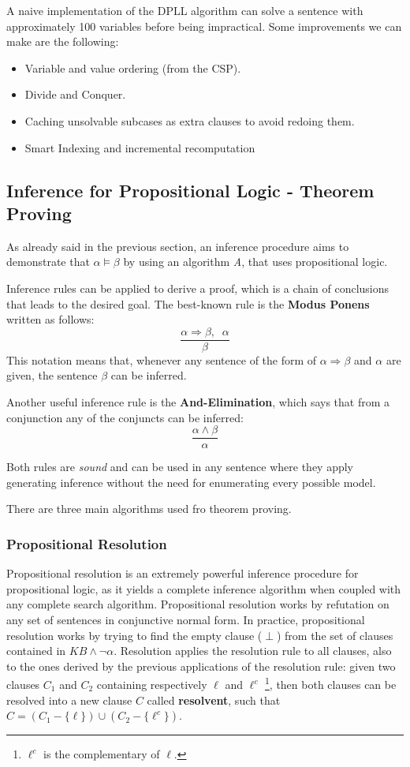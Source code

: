 \documentclass{article}
\begin{document}
A naive implementation of the DPLL algorithm can solve a sentence with approximately 100 variables before being impractical. Some improvements we can make are the following:
\begin{itemize}
    \item Variable and value ordering (from the CSP).
    \item Divide and Conquer.
    \item Caching unsolvable subcases as extra clauses to avoid redoing them.
    \item Smart Indexing and incremental recomputation 
\end{itemize}

\subsection{Inference for Propositional Logic - Theorem Proving}
As already said in the previous section, an inference procedure aims to demonstrate that \(\alpha \models \beta\) by using an algorithm \textit{A}, that uses propositional logic. 

Inference rules can be applied to derive a proof, which is a chain of conclusions that leads to the desired goal. The best-known rule is the \textbf{Modus Ponens} written as follows:
\[\frac{\alpha \Rightarrow \beta, \;\; \alpha}{\beta}\]
This notation means that, whenever any sentence of the form of \(\alpha \Rightarrow \beta\) and \(\alpha\) are given, the sentence \(\beta\) can be inferred.

Another useful inference rule is the \textbf{And-Elimination}, which says that from a conjunction any of the conjuncts can be inferred:
\[\frac{\alpha \land \beta}{\alpha}\]

Both rules are \textit{sound} and can be used in any sentence where they apply generating inference without the need for enumerating every possible model. 

There are three main algorithms used fro theorem proving.

\subsubsection{Propositional Resolution}
Propositional resolution is an extremely powerful inference procedure for propositional logic, as it yields a complete inference algorithm when coupled with any complete search algorithm. Propositional resolution works by refutation on any set of sentences in conjunctive normal form. In practice, propositional resolution works by trying to find the empty clause (\(\perp\)) from the set of clauses contained in \(KB \land \neg \alpha\). Resolution applies the resolution rule to all clauses, also to the ones derived by the previous applications of the resolution rule: given two clauses \(C_1\) and \(C_2\) containing respectively \(\ell\) and \(\ell^c\) \footnote{\(\ell^c\) is the complementary of \(\ell\).}, then both clauses can be resolved into a new clause \(C\) called \textbf{resolvent}, such that \(C=(C_1 - \{\ell\})\cup(C_2-\{\ell^c\})\).
\end{document}
